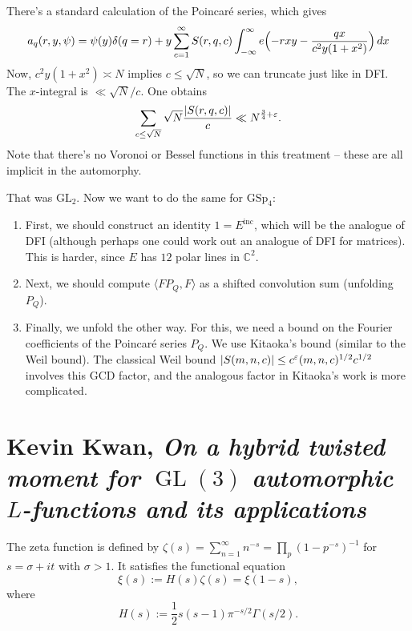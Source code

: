 \documentclass[reqno]{amsart} 
\begin{document}
There's a standard calculation of the Poincaré series, which gives
\begin{equation*}
  a_q(r, y, \psi) = \psi(y) \delta(q = r)
  + y
  \sum_{c = 1}^\infty S(r, q, c)
  \int_{- \infty}^\infty e\Bigl(- r x y - \frac{q x}{c^2 y(1 + x^2)}\Bigr) \, d x
\end{equation*}
Now, $c^2 y(1 + x^2) \asymp N$ implies $c \leq \sqrt{N}$, so we can truncate just like in DFI.  The $x$-integral is $\ll \sqrt{N}/c$.  One obtains
\begin{equation*}
  \sum_{c \leq \sqrt{N}}
  \sqrt{N}
  \frac{\lvert S(r, q, c) \rvert}{c}
  \ll N^{\frac{3}{4} + \varepsilon}.
\end{equation*}
Note that there's no Voronoi or Bessel functions in this treatment -- these are all implicit in the automorphy.

That was $\mathrm{GL}_2$.  Now we want to do the same for $\mathrm{GSp}_4$:
\begin{enumerate}
\item First, we should construct an identity $1 = E^{\mathrm{inc}}$, which will be the analogue of DFI (although perhaps one could work out an analogue of DFI for matrices).  This is harder, since $E$ has $12$ polar lines in $\mathbb{C}^2$.  
\item Next, we should compute $\langle F P_Q, F\rangle$ as a shifted convolution sum (unfolding $P_Q$).
\item Finally, we unfold the other way.  For this, we need a bound on the Fourier coefficients of the Poincaré series $P_Q$.  We use Kitaoka's bound (similar to the Weil bound).  The classical Weil bound $\lvert S(m, n, c) \rvert \leq c^\varepsilon(m, n, c)^{1/2} c^{1/2}$ involves this GCD factor, and the analogous factor in Kitaoka's work is more complicated.
\end{enumerate}

\section{Kevin Kwan, \emph{On a hybrid twisted moment for} $\operatorname{GL}(3)$ \emph{automorphic} $L$\emph{-functions and its applications}
}
The zeta function is defined by $\zeta(s) = \sum_{n = 1}^\infty n^{- s} = \prod_p(1 - p^{- s})^{-1}$ for $s = \sigma + i t$ with $\sigma > 1$.  It satisfies the functional equation
\begin{equation*}
  \xi(s) := H(s) \zeta(s) = \xi(1 - s),
\end{equation*}
where
\begin{equation*}
  H(s) := \frac{1}{2} s(s - 1) \pi^{- s/2} \Gamma(s/2).
\end{equation*}
\end{document}
